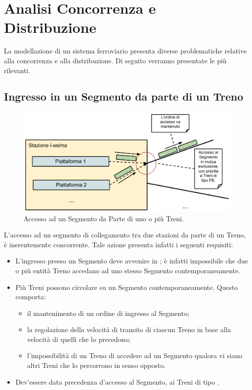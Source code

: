 \chapter{Analisi Concorrenza e Distribuzione}

La modellazione di un sistema ferroviario presenta diverse problematiche relative alla concorrenza e alla distribuzione. Di seguito verranno presentate le più rilevanti.

\section{Ingresso in un Segmento da parte di un Treno}\label{ingresso_segmento}

\begin{figure}[htbp]
	\includegraphics[width=\textwidth,keepaspectratio]{imgs/ingresso_segmento.pdf}
	\caption{\footnotesize{Accesso ad un Segmento da Parte di uno o più Treni.}}
\end{figure}

L'accesso ad un segmento di collegamento tra due stazioni da parte di un Treno, è inerentemente concorrente. Tale azione presenta infatti i seguenti requisiti:
	\begin{itemize}
		\item L'ingresso presso un Segmento deve avvenire in ; è infatti impossibile che due o più entità Treno accedano ad uno stesso Segmento contemporaneamente.
		\item Più Treni possono circolare su un Segmento contemporaneamente. Questo comporta:
			\begin{itemize}
				\item il mantenimento di un ordine di ingresso al Segmento;
				\item la regolazione della velocità di transito di ciascun Treno in base alla velocità di quelli che lo precedono;
				\item l'impossibilità di un Treno di accedere ad un Segmento qualora vi siano altri Treni che lo percorrono in senso opposto.
			\end{itemize}
		\item Dev'essere data precedenza d'accesso al Segmento, ai Treni di tipo .
	\end{itemize}


